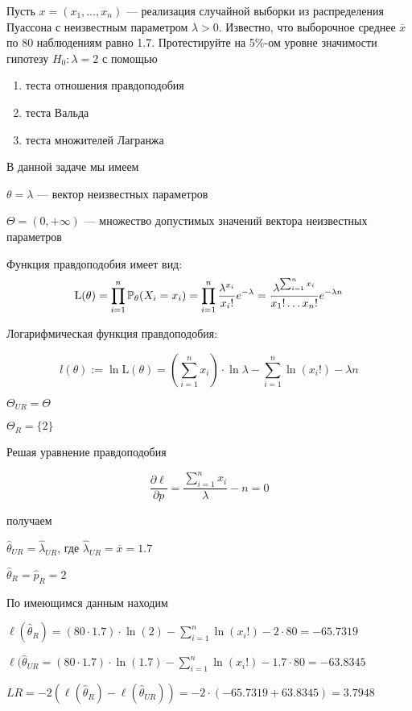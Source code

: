 \begin{problem}
Пусть $x = (x_1, \ldots, x_n)$ — реализация случайной выборки из распределения Пуассона с неизвестным параметром $\lambda > 0$. Известно, что выборочное среднее $\overline{x}$ по 80 наблюдениям равно 1.7. Протестируйте на 5\%-ом уровне значимости гипотезу $H_0: \lambda = 2$ с помощью
\begin{enumerate}
\item теста отношения правдоподобия
\item теста Вальда
\item теста множителей Лагранжа
\end{enumerate}



\begin{sol}
В данной задаче мы имеем

$\theta = \lambda$ — вектор неизвестных параметров

$\Theta = (0, +\infty)$ — множество допустимых значений вектора неизвестных параметров

Функция правдоподобия имеет вид:
\[\text{L}(\theta) = \prod_{i=1}^n \P_{\theta}(X_i = x_i) = \prod_{i=1}^n \frac{\lambda^{x_i}}{x_i !} e^{-\lambda} = \frac{\lambda^{\sum_{i=1}^n x_i}}{x_1!\ldots x_n!}e^{-\lambda n}\]

Логарифмическая функция правдоподобия:

\[l(\theta) := \ln \text{L}(\theta) = \left( \sum_{i=1}^n x_i \right) \cdot \ln\lambda - \sum_{i=1}^n \ln (x_i!) - \lambda n\]

$\Theta_{UR} = \Theta$

$\Theta_{R} = \{2\}$

Решая уравнение правдоподобия

\[
\frac{\partial \ell}{\partial p} = \frac{\sum_{i=1}^n x_i}{\lambda} - n = 0
\]

получаем

$\hat{\theta}_{UR} = \hat{\lambda}_{UR}$, где $\hat{\lambda}_{UR} = \overline{x} = 1.7$

$\hat{\theta}_{R} = \hat{p}_{R} = 2$

По имеющимся данным находим

$\ell(\hat{\theta}_{R}) = (80 \cdot 1.7) \cdot \ln(2) - \sum_{i=1}^n \ln (x_i!) - 2 \cdot 80 = -65.7319$

$\ell(\hat{\theta}_{UR} = (80 \cdot 1.7) \cdot \ln(1.7) - \sum_{i=1}^n \ln (x_i!) - 1.7 \cdot 80 = -63.8345$

	$LR = -2(\ell(\hat{\theta}_{R}) - \ell(\hat\theta_{UR})) = -2 \cdot (-65.7319 + 63.8345) = 3.7948$


\end{sol}
\end{problem}
